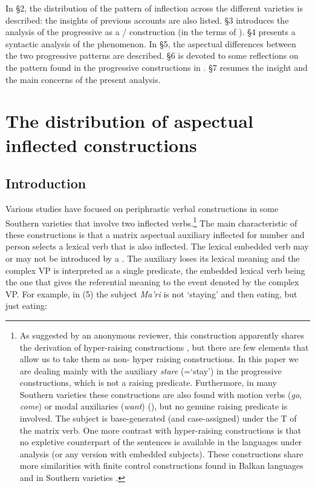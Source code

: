 \documentclass[output=paper]{langsci/langscibook}
\begin{document}
In §2, the distribution of the pattern of inflection across the different varieties is described: the insights of previous accounts are also listed. §3 introduces the analysis of the progressive as a \slash {} construction (in the terms of \citealt{Mateu1999}). §4 presents a syntactic analysis of the phenomenon. In §5, the aspectual differences between the two progressive patterns are described. §6 is devoted to some reflections on the  pattern found in the progressive constructions in . §7 resumes the insight and the main concerns of the present analysis. 

\section{The distribution of aspectual inflected constructions}%
\subsection{Introduction}%

Various studies have focused on periphrastic verbal constructions in some Southern  varieties that involve two inflected verbs.\footnote{As suggested by an anonymous reviewer, this construction apparently shares the derivation of hyper-raising constructions \citep{Harford1985,Martins2005,Nunes2008,Zeller2006}, but there are few elements that allow us to take them as non- hyper raising constructions. In this paper we are dealing mainly with the auxiliary \textit{stare} (=‘stay’) in the progressive constructions, which is not a raising predicate. Furthermore, in many Southern  varieties these constructions are also found with motion verbs (\textit{go}, \textit{come}) or modal auxiliaries (\textit{want}) (\citealt{Manzini2005,Di2015,Manzini2017,CardinalettiND}), but no genuine raising predicate is involved. The subject is base-generated (and case-assigned) under the T of the matrix verb. One more contrast with hyper-raising constructions is that no expletive counterpart of the sentences is available in the languages under analysis (or any version with embedded subjects). These constructions share more similarities with finite control constructions found in Balkan languages \citep{Landau2004,Landau2013,Manzini2000} and in Southern  varieties \citep{Manzini2005,Ledgeway2015}.}  The main characteristic of these constructions is that a matrix aspectual auxiliary inflected for number and person selects a lexical verb that is also inflected. The lexical embedded verb may or may not be introduced by a . The auxiliary loses its lexical meaning and the complex VP is interpreted as a single predicate, the embedded lexical verb being the one that gives the referential meaning to the event denoted by the complex VP. For example, in (5) the subject \textit{Ma'ri} is not ‘staying’ and then eating, but just eating:
\end{document}
